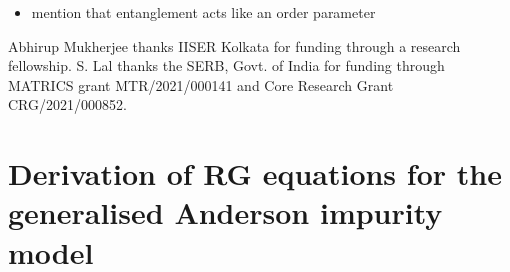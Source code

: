 \documentclass[reprint,superscriptaddress,floatfix]{revtex4-2}
\begin{document}
\begin{itemize}
	\item mention that entanglement acts like an order parameter
\end{itemize}

\acknowledgments
Abhirup Mukherjee thanks IISER Kolkata for funding through a research fellowship. S. Lal thanks the SERB, Govt. of India for funding through MATRICS grant MTR/2021/000141 and Core Research Grant CRG/2021/000852.



\appendix*

\section{Derivation of RG equations for the generalised Anderson impurity model}
\end{document}
